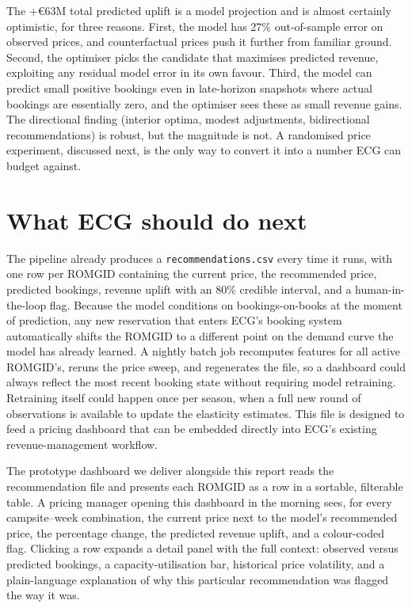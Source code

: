 \documentclass[11pt,a4paper]{article}
\begin{document}
The +\euro{}63M total predicted uplift is a model projection and is almost certainly optimistic, for three reasons. First, the model has 27\% out-of-sample error on observed prices, and counterfactual prices push it further from familiar ground. Second, the optimiser picks the candidate that maximises predicted revenue, exploiting any residual model error in its own favour. Third, the model can predict small positive bookings even in late-horizon snapshots where actual bookings are essentially zero, and the optimiser sees these as small revenue gains. The directional finding (interior optima, modest adjustments, bidirectional recommendations) is robust, but the magnitude is not. A randomised price experiment, discussed next, is the only way to convert it into a number ECG can budget against.

\section{What ECG should do next}
 
The pipeline already produces a \texttt{recommendations.csv} every time it
runs, with one row per ROMGID containing the current price, the recommended
price, predicted bookings, revenue uplift with an 80\% credible interval, and
a human-in-the-loop flag. Because the model conditions on bookings-on-books at
the moment of prediction, any new reservation that enters ECG's booking system
automatically shifts the ROMGID to a different point on the demand curve the
model has already learned. A nightly batch job recomputes features for all
active ROMGID's, reruns the price sweep, and regenerates the file, so a
dashboard could always reflect the most recent booking state without requiring model
retraining. Retraining itself could happen once per season, when a full new round of
observations is available to update the elasticity estimates. This file is
designed to feed a pricing dashboard that can be embedded directly into ECG's
existing revenue-management workflow.
 
The prototype dashboard we deliver alongside this report reads the recommendation file and presents each ROMGID as a row in a sortable, filterable table.  A pricing
manager opening this dashboard in the morning sees, for every campsite--week
combination, the current price next to the model's recommended price, the
percentage change, the predicted revenue uplift, and a colour-coded flag.
Clicking a row expands a detail panel with the full context: observed versus
predicted bookings, a capacity-utilisation bar, historical price volatility,
and a plain-language explanation of why this particular recommendation was
flagged the way it was.
\end{document}
